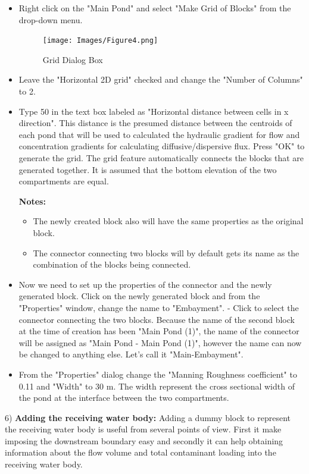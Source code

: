 \begin{itemize}
\item Right click on the "Main Pond" and select "Make Grid of Blocks" from the drop-down menu. 
\begin{figure}[!ht]\label{fig:4}
\begin{center}
\texttt{[image: Images/Figure4.png]} \\
\caption{Grid Dialog Box} 
\end{center}
\end{figure}
\item Leave the "Horizontal 2D grid" checked and change the "Number of Columns" to 2. 
\item Type 50 in the text box labeled as "Horizontal distance between cells in x direction". This distance is the presumed distance between the centroids of each pond that will be used to calculated the hydraulic gradient for flow and concentration gradients for calculating diffusive/dispersive flux. Press "OK" to generate the grid. The grid feature automatically connects the blocks that are generated together. It is assumed that the bottom elevation of the two compartments are equal. 


\textbf{Notes:}
\begin{itemize}
\item The newly created block also will have the same properties as the original block. 
\item The connector connecting two blocks will by default gets its name as the combination of the blocks being connected.
\end{itemize}
\item Now we need to set up the properties of the connector and the newly generated block. Click on the newly generated block and from the "Properties" window, change the name to "Embayment".
- Click to select the connector connecting the two blocks. Because the name of the second block at the time of creation has been "Main Pond (1)", the name of the connector will be assigned as "Main Pond - Main Pond (1)", however the name can now be changed to anything else. Let's call it "Main-Embayment". 
\item From the "Properties" dialog change the "Manning Roughness coefficient" to 0.11 and "Width" to 30 m. The width represent the cross sectional width of the pond at the interface between the two compartments. 
\end{itemize}
6) \textbf{Adding the receiving water body:}
Adding a dummy block to represent the receiving water body is useful from several points of view. First it make imposing the downstream boundary easy and secondly it can help obtaining information about the flow volume and total contaminant loading into the receiving water body. 
